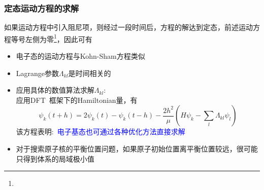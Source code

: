 \frame
{
	\frametitle{定态运动方程的求解}
	如果运动方程中引入阻尼项，则经过一段时间后，方程的解达到定态，前述运动方程等号左侧为零\footnote{\fontsize{6.2pt}{5.2pt}\selectfont{定态，意味着波函数和原子位置不再随时间变化}}，因此可有
\begin{itemize}
	\item 电子态的运动方程与\textrm{Kohn-Sham}方程类似\\
		{\fontsize{6.2pt}{5.2pt}}
	\item \textrm{Lagrange}参数$\Lambda_{kl}$是时间相关的\\
		{\fontsize{6.2pt}{5.2pt}}
	\item 应用具体的数值算法求解$\Lambda_{kl}$:~\\
	{\fontsize{6.5pt}{5.2pt}\selectfont
	应用\textrm{DFT~}框架下的\textrm{Hamiltonian}量，有
	\begin{displaymath}
		\psi_k(t+h)=2\psi_k(t)-\psi_k(t-h)-\dfrac{2h^2}{\mu}(H\psi_k-\sum_l\Lambda_{kl}\psi_l)
	\end{displaymath}
	该方程表明:~\textcolor{blue}{电子基态也可通过各种优化方法直接求解}}\\
		{\fontsize{6.2pt}{5.2pt}}
	\item 对于搜索原子核的平衡位置问题，如果原子初始位置离平衡位置较远，很可能只得到体系的局域极小值\\
		{\fontsize{6.2pt}{5.2pt}\selectfont{使用模拟退火方法，使体系跃出局域极小点，搜索全局极小值}}
\end{itemize}
}

